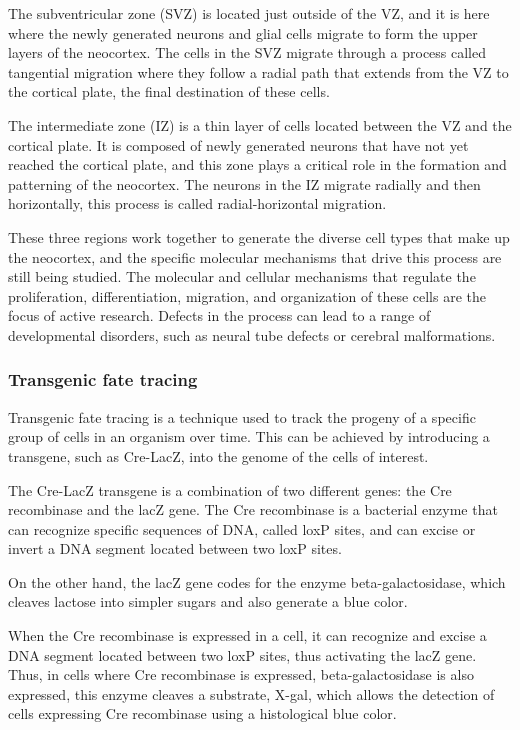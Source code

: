 \begin{itemize}
\begin{itemize}
The subventricular zone (SVZ) is located just outside of the VZ, and it is here where the newly generated neurons and glial cells migrate to form the upper layers of the neocortex. The cells in the SVZ migrate through a process called tangential migration where they follow a radial path that extends from the VZ to the cortical plate, the final destination of these cells.

The intermediate zone (IZ) is a thin layer of cells located between the VZ and the cortical plate. It is composed of newly generated neurons that have not yet reached the cortical plate, and this zone plays a critical role in the formation and patterning of the neocortex. The neurons in the IZ migrate radially and then horizontally, this process is called radial-horizontal migration.

These three regions work together to generate the diverse cell types that make up the neocortex, and the specific molecular mechanisms that drive this process are still being studied. The molecular and cellular mechanisms that regulate the proliferation, differentiation, migration, and organization of these cells are the focus of active research. Defects in the process can lead to a range of developmental disorders, such as neural tube defects or cerebral malformations.
\subsubsection{Transgenic fate tracing}
Transgenic fate tracing is a technique used to track the progeny of a specific group of cells in an organism over time. This can be achieved by introducing a transgene, such as Cre-LacZ, into the genome of the cells of interest.

The Cre-LacZ transgene is a combination of two different genes: the Cre recombinase and the lacZ gene. The Cre recombinase is a bacterial enzyme that can recognize specific sequences of DNA, called loxP sites, and can excise or invert a DNA segment located between two loxP sites.

On the other hand, the lacZ gene codes for the enzyme beta-galactosidase, which cleaves lactose into simpler sugars and also generate a blue color.

When the Cre recombinase is expressed in a cell, it can recognize and excise a DNA segment located between two loxP sites, thus activating the lacZ gene. Thus, in cells where Cre recombinase is expressed, beta-galactosidase is also expressed, this enzyme cleaves a substrate, X-gal, which allows the detection of cells expressing Cre recombinase using a histological blue color.


\end{itemize}
\end{itemize}
